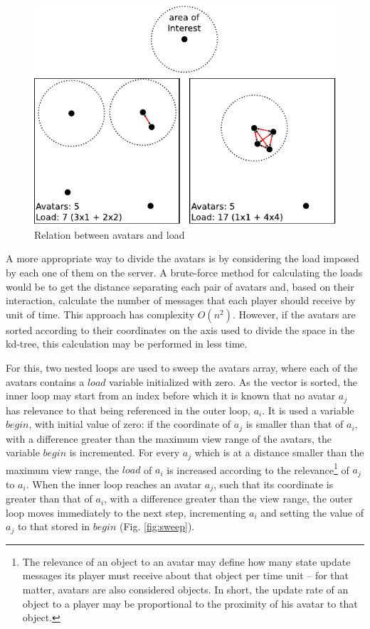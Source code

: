 \documentclass[acmjacm]{acmtrans2m}
\newcommand{\figurecaption}{Fig.}
\begin{document}
\begin{figure}
  \centering
  \includegraphics[width=0.8\linewidth]{images/carga}
  \caption{Relation between avatars and load}
  \label{fig:load}
\end{figure}

A more appropriate way to divide the avatars is by considering the load imposed by each one of them on the server. A brute-force method for calculating the loads would be to get the distance separating each pair of avatars and, based on their interaction, calculate the number of messages that each player should receive by unit of time. This approach has complexity $O(n^2)$. However, if the avatars are sorted according to their coordinates on the axis used to divide the space in the kd-tree, this calculation may be performed in less time.

For this, two nested loops are used to sweep the avatars array, where each of the avatars contains a $load$ variable initialized with zero. As the vector is sorted, the inner loop may start from an index before which it is known that no avatar $a_j$ has relevance to that being referenced in the outer loop, $a_i$. It is used a variable $begin$, with initial value of zero: if the coordinate of $a_j$ is smaller than that of $a_i$, with a difference greater than the maximum view range of the avatars, the variable $begin$ is incremented. For every $a_j$ which is at a distance smaller than the maximum view range, the $load$ of $a_i$ is increased according to the relevance\footnote{The relevance of an object to an avatar may define how many state update messages its player must receive about that object per time unit \cite{bezerra2008a3} -- for that matter, avatars are also considered objects. In short, the update rate of an object to a player may be proportional to the proximity of his avatar to that object.} of $a_j$ to $a_i$. When the inner loop reaches an avatar $a_j$, such that its coordinate is greater than that of $a_i$, with a difference greater than the view range, the outer loop moves immediately to the next step, incrementing $a_i$ and setting the value of $a_j$ to that stored in $begin$ (\figurecaption{} \ref{fig:sweep}).
\end{document}

